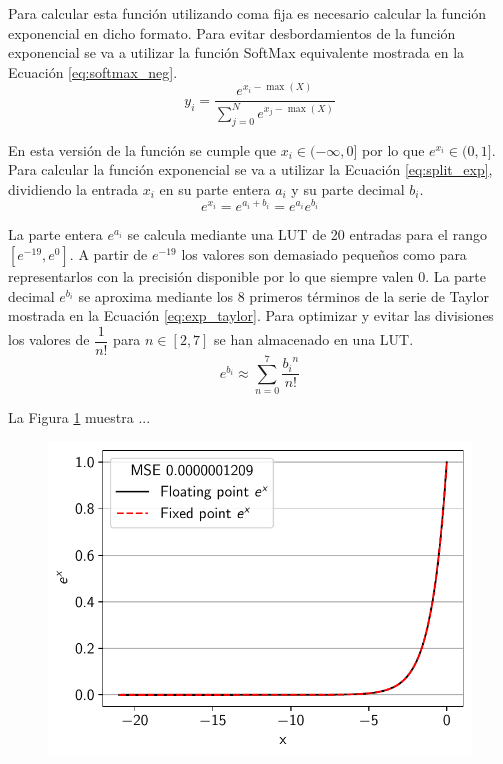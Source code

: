 Para calcular esta función utilizando coma fija es necesario calcular la función exponencial en dicho formato. Para evitar desbordamientos de la función exponencial se va a utilizar la función SoftMax equivalente mostrada en la Ecuación \ref{eq:softmax_neg}.
\begin{equation} \label{eq:softmax_neg}
y_i = \dfrac{e^{x_i - \max(X)}}{\sum_{j = 0}^N e^{x_j - \max(X)}}
\end{equation}

En esta versión de la función se cumple que $x_i \in (-\infty, 0]$ por lo que $e^{x_i} \in (0,1]$. Para calcular la función exponencial se va a utilizar la Ecuación \ref{eq:split_exp}, dividiendo la entrada $x_i$ en su parte entera $a_i$ y su parte decimal $b_i$.
\begin{equation} \label{eq:split_exp}
e^{x_i} = e^{a_i+b_i} = e^{a_i} e^{b_i}
\end{equation}

La parte entera $e^{a_i}$ se calcula mediante una LUT de 20 entradas para el rango $[e^{-19}, e^{0}]$. A partir de $e^{-19}$ los valores son demasiado pequeños como para representarlos con la precisión disponible por lo que siempre valen $0$. La parte decimal $e^{b_i}$ se aproxima mediante los 8 primeros términos de la serie de Taylor mostrada en la Ecuación \ref{eq:exp_taylor}. Para optimizar y evitar las divisiones los valores de $\dfrac{1}{n!}$ para $n \in [2,7]$ se han almacenado en una LUT.
\begin{equation} \label{eq:exp_taylor}
e^{b_i} \approx \sum_{n=0}^{7} \dfrac{{b_i}^n}{n!}
\end{equation}

La Figura \ref{fig:exp_aprox} muestra ... \todo

\begin{figure}[h]
    \centering
    \includegraphics[width=0.6\linewidth]{root/Imagenes/exp_aprox.pdf}
    \caption{\todo}
    \label{fig:exp_aprox}
\end{figure}

